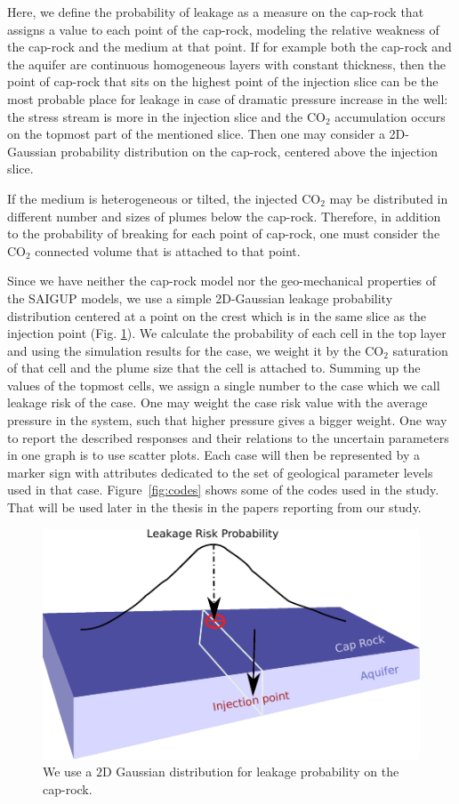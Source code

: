 Here, we define the probability of leakage as a measure on the cap-rock that
assigns a value to each point of the cap-rock, modeling the relative weakness of
the cap-rock and the medium at that point. If for example both the cap-rock and
the aquifer are continuous homogeneous layers with constant thickness, then the
point of cap-rock that sits on the highest point of the injection slice can be
the most probable place for leakage in case of dramatic pressure increase in the
well: the stress stream is more in the injection slice and the CO$_2$
accumulation occurs on the topmost part of the mentioned slice. Then one may
consider a 2D-Gaussian probability distribution on the cap-rock, centered above
the injection slice.

If the medium is heterogeneous or tilted, the injected CO$_2$ may be distributed
in different number and sizes of plumes below the cap-rock. Therefore, in
addition to the probability of breaking for each point of cap-rock, one must
consider the CO$_2$ connected volume that is attached to that point. 

Since we have neither the cap-rock model nor the geo-mechanical properties of
the SAIGUP models, we use a simple 2D-Gaussian leakage probability distribution
centered at a point on the crest which is in the same slice as the injection
point (Fig. \ref{fig:SLR}). We calculate the probability of each cell in the top
layer and using the simulation results for the case, we weight it by the CO$_2$
saturation of that cell and the plume size that the cell is attached to.
Summing up the values of the topmost cells, we assign a single number to the
case which we call leakage risk of the case. One may weight the case risk value
with the average pressure in the system, such that higher pressure gives a
bigger weight.
\vskip 1.5cm
One way to report the described responses and their relations to the uncertain
parameters in one graph is to use scatter plots. Each case will then be
represented by a marker sign with attributes dedicated to the set of geological
parameter levels used in that case. Figure~\ref{fig:codes} shows some of the
codes used in the study. That will be used later in the thesis in the papers
reporting from our study.


\begin{figure}
  \centering
  \includegraphics[width=0.65 \linewidth]{./figurer/LR_2} 
  \caption{We use a $2\mbox{D}$ Gaussian distribution for leakage probability
on the cap-rock.}
  \label{fig:SLR}
%
\end{figure}


